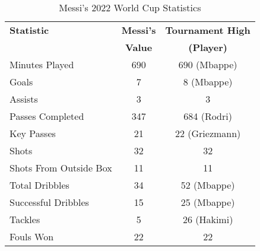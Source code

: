 \begin{table}[ht!]
    \centering
    \caption{Messi's 2022 World Cup Statistics}
    \begin{tabular}{lcc}
    \hline
    \textbf{Statistic} & \textbf{Messi's} & \textbf{Tournament High} \\
    & \textbf{Value} & \textbf{(Player)} \\ \hline
    Minutes Played & 690 & 690 (Mbappe) \\
    Goals & 7 & 8 (Mbappe) \\
    Assists & 3 & 3 \\
    Passes Completed & 347 & 684 (Rodri) \\
    Key Passes & 21 & 22 (Griezmann) \\
    Shots & 32 & 32 \\
    Shots From Outside Box & 11 & 11 \\
    Total Dribbles & 34 & 52 (Mbappe) \\
    Successful Dribbles & 15 & 25 (Mbappe) \\
    Tackles & 5 & 26 (Hakimi) \\
    Fouls Won & 22 & 22 \\ \hline
    \end{tabular}
    \label{tab:messi_worldcup_stats}
\end{table}
